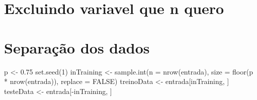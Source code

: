 \documentclass[
]{article}
\newenvironment{Shaded}{\begin{snugshade}}{\end{snugshade}}
\newcommand{\AttributeTok}[1]{\textcolor[rgb]{0.77,0.63,0.00}{#1}}
\newcommand{\ConstantTok}[1]{\textcolor[rgb]{0.00,0.00,0.00}{#1}}
\newcommand{\DecValTok}[1]{\textcolor[rgb]{0.00,0.00,0.81}{#1}}
\newcommand{\FloatTok}[1]{\textcolor[rgb]{0.00,0.00,0.81}{#1}}
\newcommand{\FunctionTok}[1]{\textcolor[rgb]{0.00,0.00,0.00}{#1}}
\newcommand{\NormalTok}[1]{#1}
\newcommand{\OtherTok}[1]{\textcolor[rgb]{0.56,0.35,0.01}{#1}}
\newcommand{\SpecialCharTok}[1]{\textcolor[rgb]{0.00,0.00,0.00}{#1}}
\newcommand{\StringTok}[1]{\textcolor[rgb]{0.31,0.60,0.02}{#1}}
\begin{document}
\hypertarget{excluindo-variavel-que-n-quero}{%
\section{Excluindo variavel que n
quero}\label{excluindo-variavel-que-n-quero}}

\begin{Shaded}
\end{Shaded}

\begin{Shaded}
\end{Shaded}

\hypertarget{separauxe7uxe3o-dos-dados}{%
\section{Separação dos dados}\label{separauxe7uxe3o-dos-dados}}

\begin{Shaded}
\begin{Highlighting}[]
\NormalTok{p }\OtherTok{\textless{}{-}} \FloatTok{0.75}
\FunctionTok{set.seed}\NormalTok{(}\DecValTok{1}\NormalTok{)}
\NormalTok{inTraining }\OtherTok{\textless{}{-}} \FunctionTok{sample.int}\NormalTok{(}\AttributeTok{n =} \FunctionTok{nrow}\NormalTok{(entrada),}
                         \AttributeTok{size =} \FunctionTok{floor}\NormalTok{(p }\SpecialCharTok{*} \FunctionTok{nrow}\NormalTok{(entrada)), }
                         \AttributeTok{replace =} \ConstantTok{FALSE}\NormalTok{)}
\NormalTok{treinoData }\OtherTok{\textless{}{-}}\NormalTok{ entrada[inTraining, ]}
\NormalTok{testeData }\OtherTok{\textless{}{-}}\NormalTok{ entrada[}\SpecialCharTok{{-}}\NormalTok{inTraining, ]}
\end{Highlighting}
\end{Shaded}
\end{document}
